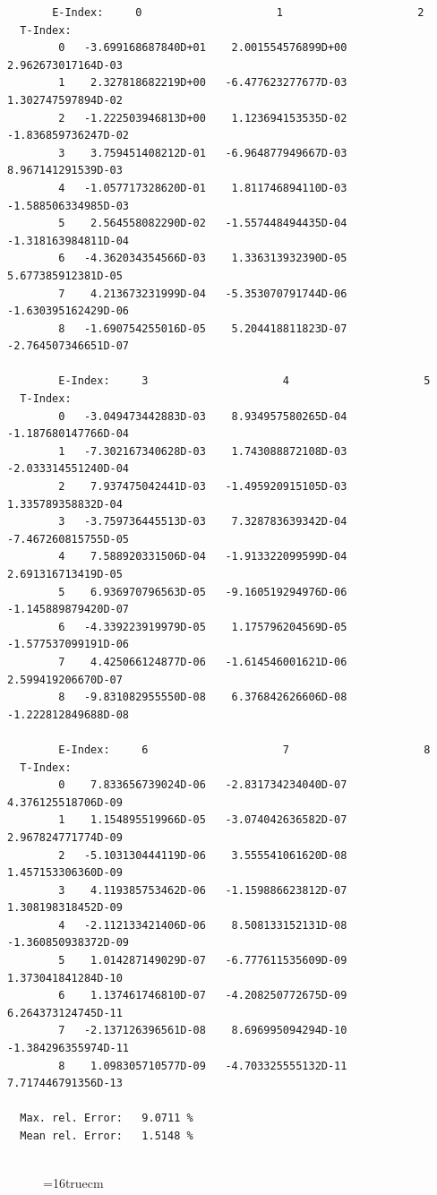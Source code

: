 \documentclass[12pt,dvips]{article}
\begin{document}
\begin{small}\begin{verbatim}
       E-Index:     0                     1                     2
  T-Index:
        0   -3.699168687840D+01    2.001554576899D+00    2.962673017164D-03
        1    2.327818682219D+00   -6.477623277677D-03    1.302747597894D-02
        2   -1.222503946813D+00    1.123694153535D-02   -1.836859736247D-02
        3    3.759451408212D-01   -6.964877949667D-03    8.967141291539D-03
        4   -1.057717328620D-01    1.811746894110D-03   -1.588506334985D-03
        5    2.564558082290D-02   -1.557448494435D-04   -1.318163984811D-04
        6   -4.362034354566D-03    1.336313932390D-05    5.677385912381D-05
        7    4.213673231999D-04   -5.353070791744D-06   -1.630395162429D-06
        8   -1.690754255016D-05    5.204418811823D-07   -2.764507346651D-07

        E-Index:     3                     4                     5
  T-Index:
        0   -3.049473442883D-03    8.934957580265D-04   -1.187680147766D-04
        1   -7.302167340628D-03    1.743088872108D-03   -2.033314551240D-04
        2    7.937475042441D-03   -1.495920915105D-03    1.335789358832D-04
        3   -3.759736445513D-03    7.328783639342D-04   -7.467260815755D-05
        4    7.588920331506D-04   -1.913322099599D-04    2.691316713419D-05
        5    6.936970796563D-05   -9.160519294976D-06   -1.145889879420D-07
        6   -4.339223919979D-05    1.175796204569D-05   -1.577537099191D-06
        7    4.425066124877D-06   -1.614546001621D-06    2.599419206670D-07
        8   -9.831082955550D-08    6.376842626606D-08   -1.222812849688D-08

        E-Index:     6                     7                     8
  T-Index:
        0    7.833656739024D-06   -2.831734234040D-07    4.376125518706D-09
        1    1.154895519966D-05   -3.074042636582D-07    2.967824771774D-09
        2   -5.103130444119D-06    3.555541061620D-08    1.457153306360D-09
        3    4.119385753462D-06   -1.159886623812D-07    1.308198318452D-09
        4   -2.112133421406D-06    8.508133152131D-08   -1.360850938372D-09
        5    1.014287149029D-07   -6.777611535609D-09    1.373041841284D-10
        6    1.137461746810D-07   -4.208250772675D-09    6.264373124745D-11
        7   -2.137126396561D-08    8.696995094294D-10   -1.384296355974D-11
        8    1.098305710577D-09   -4.703325555132D-11    7.717446791356D-13

  Max. rel. Error:   9.0711 %
  Mean rel. Error:   1.5148 %


\end{verbatim}\end{small}
\begin{figure} \label{2.2.15c}
\epsfxsize=16truecm
\end{figure}
\newpage
\end{document}
